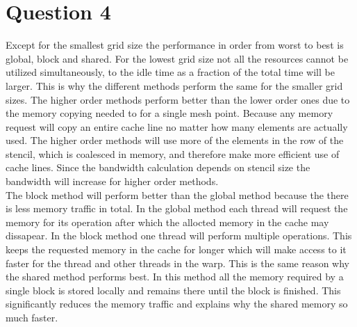 \documentclass[12pt,letterpaper,twoside]{article}
\begin{document}
 	\section*{Question 4}
 	Except for the smallest grid size the performance in order from worst to best is global, block and shared. For the lowest grid size not all the resources cannot be utilized simultaneously, to the idle time as a fraction of the total time will be larger. This is why the different methods perform the same for the smaller grid sizes. The higher order methods perform better than the lower order ones due to the memory copying needed to for a single mesh point. Because any memory request will copy an entire cache line no matter how many elements are actually used. The higher order methods will use more of the elements in the row of the stencil, which is coalesced in memory, and therefore make more efficient use of cache lines. Since the bandwidth calculation depends on stencil size the bandwidth will increase for higher order methods.\\
 	The block method will perform better than the global method because the there is less memory traffic in total. In the global method each thread will request the memory for its operation after which the allocted memory in the cache may dissapear. In the block method one thread will perform multiple operations. This keeps the requested memory in the cache for longer which will make access to it faster for the thread and other threads in the warp. This is the same reason why the shared method performs best. In this method all the memory required by a single block is stored locally and remains there until the block is finished. This significantly reduces the memory traffic and explains why the shared memory so much faster.
 
\end{document}
